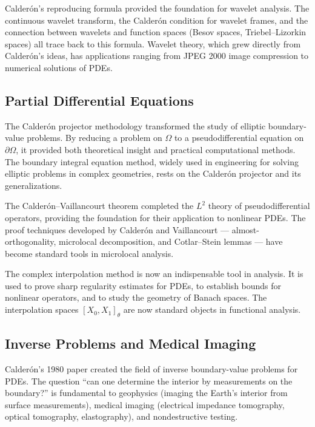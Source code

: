 Calder\'{o}n's reproducing formula provided the foundation for wavelet analysis. The continuous wavelet transform, the Calder\'{o}n condition for wavelet frames, and the connection between wavelets and function spaces (Besov spaces, Triebel--Lizorkin spaces) all trace back to this formula. Wavelet theory, which grew directly from Calder\'{o}n's ideas, has applications ranging from JPEG 2000 image compression to numerical solutions of PDEs.

\subsection{Partial Differential Equations}

The Calder\'{o}n projector methodology transformed the study of elliptic boundary-value problems. By reducing a problem on $\Omega$ to a pseudodifferential equation on $\partial\Omega$, it provided both theoretical insight and practical computational methods. The boundary integral equation method, widely used in engineering for solving elliptic problems in complex geometries, rests on the Calder\'{o}n projector and its generalizations.

The Calder\'{o}n--Vaillancourt theorem completed the $L^2$ theory of pseudodifferential operators, providing the foundation for their application to nonlinear PDEs. The proof techniques developed by Calder\'{o}n and Vaillancourt --- almost-orthogonality, microlocal decomposition, and Cotlar--Stein lemmas --- have become standard tools in microlocal analysis.

The complex interpolation method is now an indispensable tool in analysis. It is used to prove sharp regularity estimates for PDEs, to establish bounds for nonlinear operators, and to study the geometry of Banach spaces. The interpolation spaces $[X_0, X_1]_\theta$ are now standard objects in functional analysis.

\subsection{Inverse Problems and Medical Imaging}

Calder\'{o}n's 1980 paper created the field of inverse boundary-value problems for PDEs. The question ``can one determine the interior by measurements on the boundary?'' is fundamental to geophysics (imaging the Earth's interior from surface measurements), medical imaging (electrical impedance tomography, optical tomography, elastography), and nondestructive testing.

